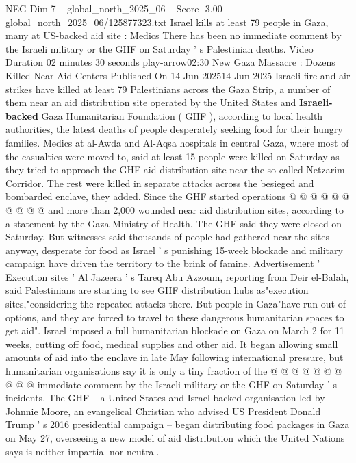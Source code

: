 \begin{textsample}{NEG Dim 7 – global\_north\_2025\_06 – Score -3.00 – global\_north\_2025\_06/125877323.txt}  \label{ex:f7_neg_071}
Israel kills at least 79 people in Gaza, many at US-backed aid site : Medics There has been no immediate comment by the Israeli military or the GHF on Saturday ' s Palestinian deaths.
Video Duration 02 minutes 30 seconds play-arrow02:30 New Gaza Massacre : Dozens Killed Near Aid Centers Published On 14 Jun 202514 Jun 2025 Israeli fire and air strikes have killed at least 79 Palestinians across the Gaza Strip, a number of them near an aid distribution site operated by the United States and \textbf{Israeli-backed} Gaza Humanitarian Foundation ( GHF ), according to local health authorities, the latest deaths of people desperately seeking food for their hungry families.
Medics at al-Awda and Al-Aqsa hospitals in central Gaza, where most of the casualties were moved to, said at least 15 people were killed on Saturday as they tried to approach the GHF aid distribution site near the so-called Netzarim Corridor.
The rest were killed in separate attacks across the besieged and bombarded enclave, they added.
Since the GHF started operations @ @ @ @ @ @ @ @ @ @ and more than 2,000 wounded near aid distribution sites, according to a statement by the Gaza Ministry of Health.
The GHF said they were closed on Saturday.
But witnesses said thousands of people had gathered near the sites anyway, desperate for food as Israel ' s punishing 15-week blockade and military campaign have driven the territory to the brink of famine.
Advertisement ' Execution sites ' Al Jazeera ' s Tareq Abu Azzoum, reporting from Deir el-Balah, said Palestinians are starting to see GHF distribution hubs as"execution sites,"considering the repeated attacks there.
But people in Gaza"have run out of options, and they are forced to travel to these dangerous humanitarian spaces to get aid".
Israel imposed a full humanitarian blockade on Gaza on March 2 for 11 weeks, cutting off food, medical supplies and other aid.
It began allowing small amounts of aid into the enclave in late May following international pressure, but humanitarian organisations say it is only a tiny fraction of the @ @ @ @ @ @ @ @ @ @ immediate comment by the Israeli military or the GHF on Saturday ' s incidents.
The GHF -- a United States and Israel-backed organisation led by Johnnie Moore, an evangelical Christian who advised US President Donald Trump ' s 2016 presidential campaign -- began distributing food packages in Gaza on May 27, overseeing a new model of aid distribution which the United Nations says is neither impartial nor neutral.

\end{textsample}
